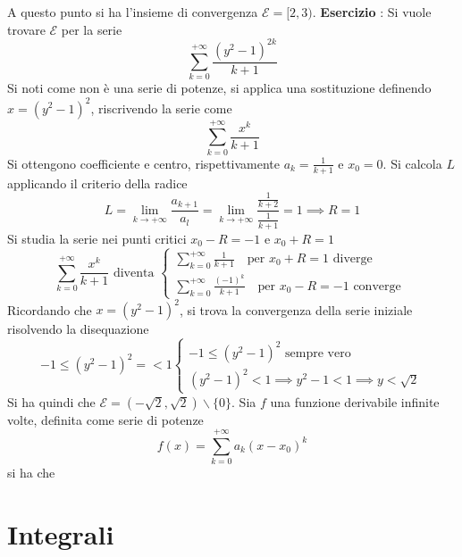 \documentclass[10pt, letterpaper]{report}
\begin{document}
 A questo punto si ha l'insieme di convergenza $\mathcal{E}=[2,3)$.\acc 
 \textbf{Esercizio} :  Si vuole trovare $\mathcal{E}$ per la serie 
 $$ \displaystyle \sum_{k=0}^{+\infty}\frac{(y^2-1)^{2k}}{k+1} $$
 Si noti come non è una serie di potenze, si applica una sostituzione definendo 
 $x=(y^2-1)^2$, riscrivendo la serie come $$ 
 \displaystyle \sum_{k=0}^{+\infty}\frac{x^{k}}{k+1}$$
 Si ottengono coefficiente e centro, rispettivamente $a_k=\frac{1}{k+1}$ e $x_0 = 0$. Si 
 calcola $L$ applicando il criterio della radice 
 $$ L =\displaystyle \lim_{k\rightarrow+\infty}\frac{a_{k+1}}{a_l}=\displaystyle 
 \lim_{k\rightarrow+\infty}\dfrac{\frac{1}{k+2}}{\frac{1}{k+1}}=1\implies R=1$$
 Si studia la serie 
 nei punti critici   $x_0-R=-1$  e $x_0+R=1$
 $$ 
 \displaystyle \sum_{k=0}^{+\infty}\frac{x^{k}}{k+1}\text{ diventa }  \begin{cases}
    \displaystyle \sum_{k=0}^{+\infty}\frac{1}{k+1} \text{  }\text{ per }x_0+R=1 \text{ diverge }\\
   \displaystyle \sum_{k=0}^{+\infty}\frac{(-1)^{k}}{k+1}\text{  }\text{ per }x_0-R=-1\text{ converge }
 \end{cases}$$
 Ricordando che  $x=(y^2-1)^2$, si trova la convergenza della serie iniziale risolvendo 
 la disequazione
 $$ -1\le (y^2-1)^2= <1\begin{cases}
    -1\le (y^2-1)^2\text{ sempre vero }\\ (y^2-1)^2<1\implies y^2-1<1\implies y<\sqrt{2}
 \end{cases}$$
 Si ha quindi che $\mathcal{E}=(-\sqrt{2},\sqrt{2})\backslash\{0\}$.\acc
 \prop{} Sia $f$ una funzione derivabile infinite volte, definita come serie di potenze 
 $$ f(x)=\displaystyle \sum_{k=0}^{+\infty}a_k(x-x_0)^k $$
 si ha che 
 \chapter{Integrali}
\end{document}
